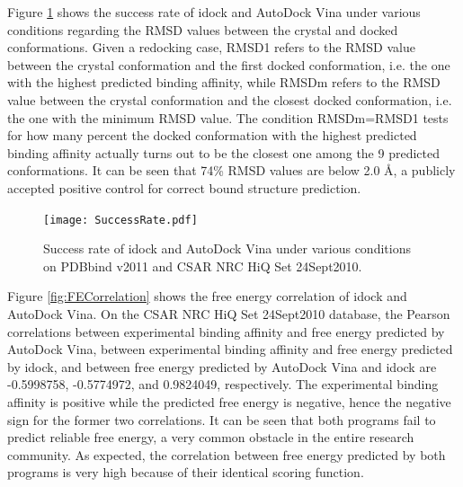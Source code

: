 \documentclass[10pt,conference,compsocconf]{../IEEEtran}
\begin{document}
Figure \ref{fig:SuccessRate} shows the success rate of idock and AutoDock Vina under various conditions regarding the RMSD values between the crystal and docked conformations. Given a redocking case, RMSD1 refers to the RMSD value between the crystal conformation and the first docked conformation, i.e. the one with the highest predicted binding affinity, while RMSDm refers to the RMSD value between the crystal conformation and the closest docked conformation, i.e. the one with the minimum RMSD value. The condition RMSDm=RMSD1 tests for how many percent the docked conformation with the highest predicted binding affinity actually turns out to be the closest one among the 9 predicted conformations. It can be seen that 74\% RMSD values are below 2.0 \AA, a publicly accepted positive control for correct bound structure prediction.

\begin{figure}
\centering
\texttt{[image: SuccessRate.pdf]}
\caption{Success rate of idock and AutoDock Vina under various conditions on PDBbind v2011 and CSAR NRC HiQ Set 24Sept2010.}
\label{fig:SuccessRate}
\end{figure}

Figure \ref{fig:FECorrelation} shows the free energy correlation of idock and AutoDock Vina. On the CSAR NRC HiQ Set 24Sept2010 database, the Pearson correlations between experimental binding affinity and free energy predicted by AutoDock Vina, between experimental binding affinity and free energy predicted by idock, and between free energy predicted by AutoDock Vina and idock are -0.5998758, -0.5774972, and 0.9824049, respectively. The experimental binding affinity is positive while the predicted free energy is negative, hence the negative sign for the former two correlations. It can be seen that both programs fail to predict reliable free energy, a very common obstacle in the entire research community. As expected, the correlation between free energy predicted by both programs is very high because of their identical scoring function.
\end{document}
